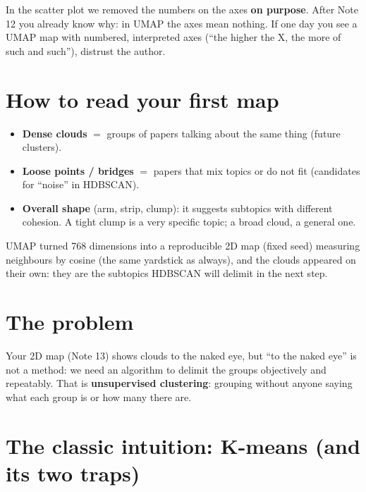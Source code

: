\documentclass[11pt,a4paper]{article}
\begin{document}
\begin{ojo}
In the scatter plot we removed the numbers on the axes \textbf{on purpose}. After Note 12 you
already know why: in UMAP the axes mean nothing. If one day you see a UMAP map with numbered,
interpreted axes (``the higher the X, the more of such and such''), distrust the author.
\end{ojo}

\section{How to read your first map}

\begin{itemize}
  \item \textbf{Dense clouds} $=$ groups of papers talking about the same thing (future clusters).
  \item \textbf{Loose points / bridges} $=$ papers that mix topics or do not fit (candidates
        for ``noise'' in HDBSCAN).
  \item \textbf{Overall shape} (arm, strip, clump): it suggests subtopics with different
        cohesion. A tight clump is a very specific topic; a broad cloud, a general one.
\end{itemize}

\begin{resumen}
UMAP turned 768 dimensions into a reproducible 2D map (fixed seed) measuring neighbours by
cosine (the same yardstick as always), and the clouds appeared on their own: they are the
subtopics HDBSCAN will delimit in the next step.
\end{resumen}
\clearpage
{}
{}

\section{The problem}

Your 2D map (Note 13) shows clouds to the naked eye, but ``to the naked eye'' is not a method:
we need an algorithm to delimit the groups objectively and repeatably. That is
\textbf{unsupervised clustering}: grouping without anyone saying what each group is or how
many there are.

\section{The classic intuition: K-means (and its two traps)}
\end{document}
